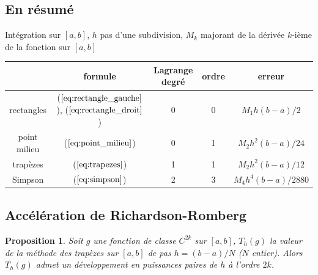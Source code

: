 \documentclass[a4paper,11pt]{article}
\newtheorem{prop}[thm]{Proposition}
\begin{document}
\begin{giacjshere}
\subsection{En r\'esum\'e}
Int\'egration sur $[a,b]$, $h$ pas d'une subdivision, $M_k$ majorant
de la d\'eriv\'ee $k$-i\`eme de la fonction sur $[a,b]$\\
\begin{tabular}{|c|c|c|c|c|} \hline 
 & formule & Lagrange degr\'e & ordre & erreur \\ \hline
rectangles & (\(\ref{eq:rectangle_gauche}\)), (\(\ref{eq:rectangle_droit}\)) & 0 & 0 & $M_1 h (b-a)/2$ \\
point milieu & (\(\ref{eq:point_milieu}\)) & 0 & 1 & $M_2 h^2 (b-a)/24$ \\
trap\`ezes & (\(\ref{eq:trapezes}\)) & 1 & 1 & $M_2 h^2 (b-a)/12$ \\
Simpson & (\(\ref{eq:simpson}\))& 2 & 3 & $M_4 h^4 (b-a)/2880$  \\ \hline
\end{tabular}

\subsection{Accélération de Richardson-Romberg}
\begin{prop}
Soit $g$ une fonction de classe $C^{2k}$ sur $[a,b]$, 
$T_h(g)$ la valeur de la méthode des trapèzes sur $[a,b]$ de pas 
$h=(b-a)/N$ ($N$ entier).
Alors $T_h(g)$ admet un développement en puissances paires de $h$
à l'ordre $2k$.
\end{prop}


\end{giacjshere}
\end{document}
